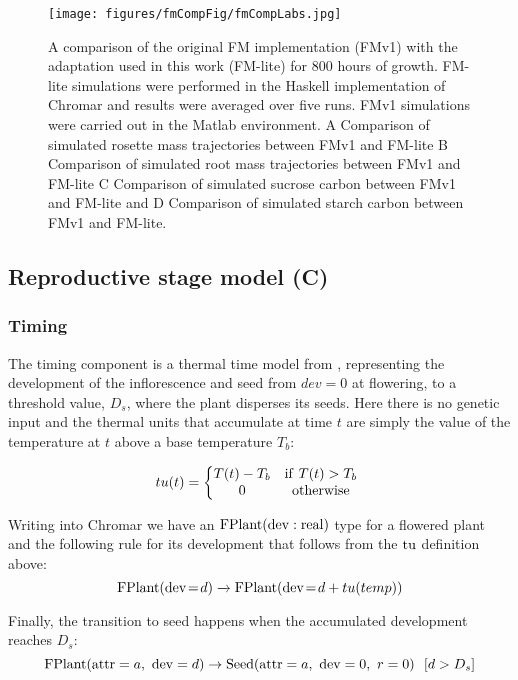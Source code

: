 \begin{figure}[tb]
  \centering
  \texttt{[image: figures/fmCompFig/fmCompLabs.jpg]}
  \caption{A comparison of the original FM implementation (FMv1) with the
    adaptation used in this work (FM-lite) for 800 hours of growth. FM-lite
    simulations were performed in the Haskell implementation of Chromar and
    results were averaged over five runs. FMv1 simulations were carried out in
    the Matlab environment. A Comparison of simulated rosette mass trajectories
    between FMv1 and FM-lite B Comparison of simulated root mass trajectories
    between FMv1 and FM-lite C Comparison of simulated sucrose carbon between
    FMv1 and FM-lite and D Comparison of simulated starch carbon between FMv1
    and FM-lite.}
  \label{fig:comp}
\end{figure}

\subsection{Reproductive stage model (C)}
\label{reproductive-stage-model-c}

\subsubsection*{Timing}
\label{timing-1}

The timing component is a thermal time model from
\citet{burghardt_modeling_2015}, representing the development of the
inflorescence and seed from \(dev = 0\) at flowering, to a threshold value,
\(D_{s}\), where the plant disperses its seeds. Here there is no genetic input
and the thermal units that accumulate at time \(t\) are simply the value of the
temperature at \(t\) above a base temperature \(T_{b}\):

\[tu(t) = \left\{ \begin{matrix}
T(t) - T_{b} & \mathrm{if\ }T(t) > T_{b} \\
0 & \mathrm{otherwise} \\
\end{matrix} \right.\ \]

Writing into Chromar we have an
\(\mathrm{FPlant}(\mathrm{dev}:\mathrm{real})\) type for a flowered plant and
the following rule for its development that follows from the
\(\mathrm{tu}\) definition above:
$$
\mathrm{FPlant}( \mathrm{dev} \! = \! {d} ) \xrightarrow{} \mathrm{FPlant}(\mathrm{dev} \! = \! {d + tu(temp)})
$$

Finally, the transition to seed happens when the accumulated development
reaches \(D_{s}\):
\[\mathrm{FPlant}( \mathrm{attr} = a,\mathrm{\ dev} = d ) \rightarrow \mathrm{Seed}( \mathrm{attr} = a,\ \mathrm{dev} = 0,\ r = 0 )\ \ \lbrack d > D_{s}\rbrack\]

